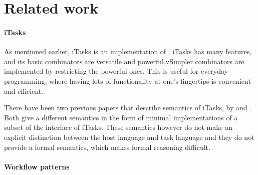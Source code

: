 


\section{Related work}
\label{sec:relatedwork}



\paragraph{iTasks}

As mentioned earlier, iTasks is an implementation of \TOP. iTasks has many
features, and its basic combinators are versatile and powerful.vSimpler
combinators are implemented by restricting the powerful ones. This is useful for
everyday programming, where having lots of functionality at one's fingertips is
convenient and efficient.

There have been two previous papers that describe semantics of iTasks, by
\citet{conf/ifl/KoopmanPA08} and \citet{conf/ppdp/PlasmeijerLMAK12}.
Both give a different semantics in the form of minimal implementations of a
subset of the interface of iTasks. These semantics however do not make an
explicit distinction between the host language and task language and they do not
provide a formal semantics, which makes formal reasoning difficult.




\paragraph{Workflow patterns}


